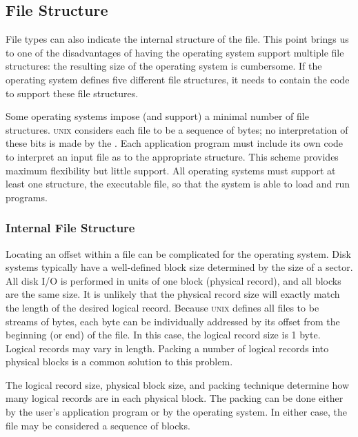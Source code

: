 \subsection{File Structure}\label{subsec:File_Structure}
File types can also indicate the internal structure of the file.
This point brings us to one of the disadvantages of having the operating system support multiple file structures: the resulting size of the operating system is cumbersome.
If the operating system defines five different file structures, it needs to contain the code to support these file structures.

Some operating systems impose (and support) a minimal number of file structures.
\textsc{unix} considers each file to be a sequence of bytes; no interpretation of these bits is made by the \textbf{}.
Each application program must include its own code to interpret an input file as to the appropriate structure.
This scheme provides maximum flexibility but little support.
All operating systems must support at least one structure, the executable file, so that the system is able to load and run programs.

\subsubsection{Internal File Structure}\label{subsubsec:Internal_File_Structure}
Locating an offset within a file can be complicated for the operating system.
Disk systems typically have a well-defined block size determined by the size of a sector.
All disk I/O is performed in units of one block (physical record), and all blocks are the same size.
It is unlikely that the physical record size will exactly match the length of the desired logical record.
Because \textsc{unix} defines all files to be streams of bytes, each byte can be individually addressed by its offset from the beginning (or end) of the file.
In this case, the logical record size is 1 byte.
Logical records may vary in length.
Packing a number of logical records into physical blocks is a common solution to this problem.

The logical record size, physical block size, and packing technique determine how many logical records are in each physical block.
The packing can be done either by the user’s application program or by the operating system.
In either case, the file may be considered a sequence of blocks.


